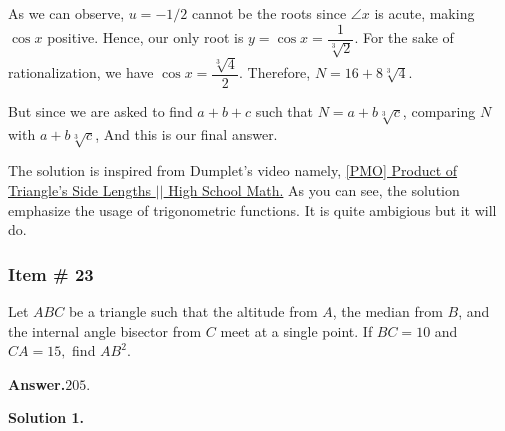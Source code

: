 \documentclass[11pt,paper=letter]{scrartcl}
\newcommand{\ans}[1]{{\sffamily \bfseries Answer.}\;\(\boxed{\text{#1}}\).}
\newcommand{\soln}[1]{{\sffamily \bfseries Solution #1.}\;}
\newenvironment{rem}%
{\noindent \ignorespaces \small \sffamily  \sansmath {\bfseries \color{DarkMidnightBlue} Remark.}}%
{\ignorespacesafterend}
\begin{document}
    As we can observe, $u = -1/2$ cannot be the roots since $\angle x$ is acute, making $\cos x$ positive. Hence, our only root is $y = \cos x = \dfrac{1}{\sqrt[3]{{2}}}$. For the sake of rationalization, we have $\cos x = \dfrac{\sqrt[3]{4}}{2} $. Therefore, $N = 16 + 8\sqrt[3]{4}$.
    
    But since we are asked to find $a+b+c$ such that $N = a + b\sqrt[3]{c}$, comparing $N$ with $a + b\sqrt[3]{c}$,  And this is our final answer.
    
    \newpage
    
    \begin{mdframed}
    \begin{rem}
The solution is inspired from Dumplet's video namely, \href{https://www.youtube.com/watch?v=ia3DK69nhrY}{[PMO] Product of Triangle's Side Lengths $| |$ High School Math.} As you can see, the solution emphasize the usage of trigonometric functions. It is quite ambigious but it will do. 
    \end{rem}
    \end{mdframed}

 




\subsubsection{Item \# 23}

\begin{probboxed}
Let $ABC$ be a triangle such that the altitude from $A$, the median from $B$, and the internal angle bisector from $C$ meet at a single point. If $BC = 10$ and $CA = 15,$ find $AB^2.$
\end{probboxed}

\ans{205}

\soln1
\end{document}
